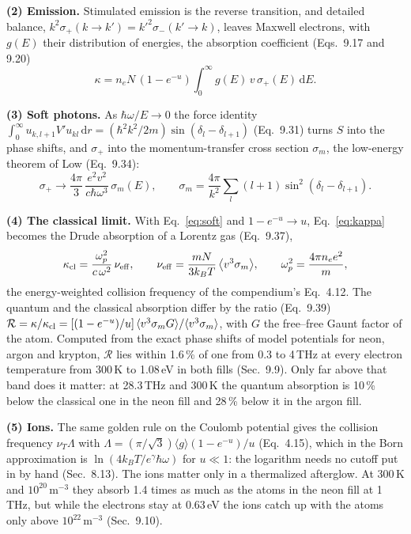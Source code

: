 \documentclass[11pt]{article}
\newcommand{\dd}{\mathrm d}
\newcommand{\kB}{k_B}
\begin{document}
\textbf{(2) Emission.} Stimulated emission is the reverse transition, and detailed balance,
$k^2\sigma_+(k\to k')=k'^2\sigma_-(k'\to k)$, leaves Maxwell electrons, with $g(E)$ their
distribution of energies, the absorption coefficient (Eqs.~9.17 and 9.20)
\begin{equation}
\kappa=n_eN\,(1-e^{-u})\int_0^\infty g(E)\,v\,\sigma_+(E)\,\dd E .
\label{eq:kappa}
\end{equation}

\textbf{(3) Soft photons.} As $\hbar\omega/E\to0$ the force identity
$\int_0^\infty u_{k,l+1}V'u_{kl}\,\dd r=(\hbar^2k^2/2m)\sin(\delta_l-\delta_{l+1})$ (Eq.~9.31) turns $S$
into the phase shifts, and $\sigma_+$ into the momentum-transfer cross section $\sigma_m$, the
low-energy theorem of Low \cite{Low1958} (Eq.~9.34):
\begin{equation}
\sigma_+\to\frac{4\pi}{3}\,\frac{e^2v^2}{c\hbar\omega^3}\,\sigma_m(E),\qquad
\sigma_m=\frac{4\pi}{k^2}\sum_l(l+1)\sin^2(\delta_l-\delta_{l+1}).
\label{eq:soft}
\end{equation}

\textbf{(4) The classical limit.} With Eq.~\eqref{eq:soft} and $1-e^{-u}\to u$, Eq.~\eqref{eq:kappa} becomes the Drude
absorption of a Lorentz gas (Eq.~9.37),
\begin{equation}
\kappa_{\rm cl}=\frac{\omega_p^2}{c\,\omega^2}\,\nu_{\rm eff},\qquad
\nu_{\rm eff}=\frac{mN}{3\kB T}\,\big\langle v^3\sigma_m\big\rangle,\qquad
\omega_p^2=\frac{4\pi n_ee^2}{m},
\label{eq:classical}
\end{equation}
the energy-weighted collision frequency of the compendium's Eq.~4.12. The quantum and the
classical absorption differ by the ratio (Eq.~9.39)
$\mathcal R=\kappa/\kappa_{\rm cl}=[(1-e^{-u})/u]\,\langle v^3\sigma_mG\rangle/\langle v^3\sigma_m\rangle$,
with $G$ the free--free Gaunt factor of the atom. Computed from the exact phase shifts of model
potentials for neon, argon and krypton, $\mathcal R$ lies within 1.6\,\% of one from 0.3 to 4\,THz
at every electron temperature from 300\,K to 1.08\,eV in both fills (Sec.~9.9). Only far above
that band does it matter: at 28.3\,THz and 300\,K the quantum absorption is 10\,\% below the
classical one in the neon fill and 28\,\% below it in the argon fill.

\textbf{(5) Ions.} The same golden rule on the Coulomb potential gives the collision frequency
$\nu_T\Lambda$ with $\Lambda=(\pi/\sqrt3)\langle g\rangle(1-e^{-u})/u$ (Eq.~4.15), which in the Born
approximation is $\ln(4\kB T/e^\gamma\hbar\omega)$ for $u\ll1$: the logarithm needs no cutoff put in
by hand (Sec.~8.13). The ions matter only in a thermalized afterglow. At 300\,K and
$10^{20}$\,m$^{-3}$ they absorb 1.4 times as much as the atoms in the neon fill at 1\,THz, but while
the electrons stay at 0.63\,eV the ions catch up with the atoms only above $10^{22}$\,m$^{-3}$
(Sec.~9.10).
\end{document}

